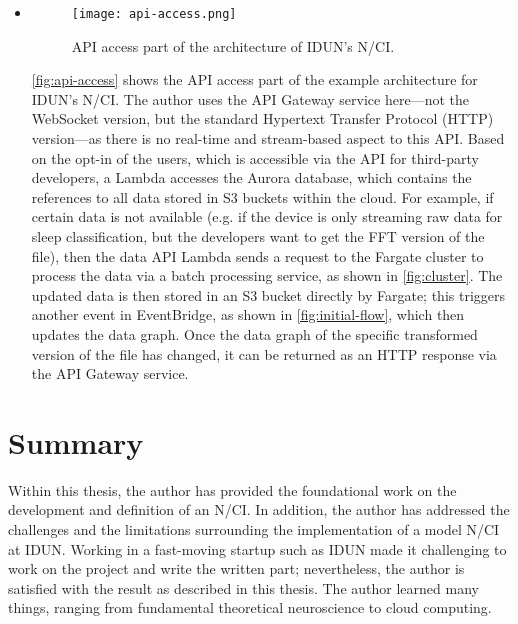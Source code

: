 \begin{itemize}
\newpage

  \item \begin{figure}[!ht]
          \centering
          \hspace*{0.4in}
          \texttt{[image: api-access.png]}
          \caption{API access part of the architecture of IDUN’s N/CI.}
          \label{fig:api-access}
        \end{figure}

        \autoref{fig:api-access} shows the API access part of the example architecture for IDUN’s N/CI. The author uses the API Gateway service here—not the WebSocket version, but the standard Hypertext Transfer Protocol (HTTP) version—as there is no real-time and stream-based aspect to this API. Based on the opt-in of the users, which is accessible via the API for third-party developers, a Lambda accesses the Aurora database, which contains the references to all data stored in S3 buckets within the cloud. For example, if certain data is not available (e.g. if the device is only streaming raw data for sleep classification, but the developers want to get the FFT version of the file), then the data API Lambda sends a request to the Fargate cluster to process the data via a batch processing service, as shown in \autoref{fig:cluster}. The updated data is then stored in an S3 bucket directly by Fargate; this triggers another event in EventBridge, as shown in \autoref{fig:initial-flow}, which then updates the data graph. Once the data graph of the specific transformed version of the file has changed, it can be returned as an HTTP response via the API Gateway service.

\end{itemize}

\section{Summary}
\label{chapter5-summary}

Within this thesis, the author has provided the foundational work on the development and definition of an N/CI. In addition, the author has addressed the challenges and the limitations surrounding the implementation of a model N/CI at IDUN. Working in a fast-moving startup such as IDUN made it challenging to work on the project and write the written part; nevertheless, the author is satisfied with the result as described in this thesis. The author learned many things, ranging from fundamental theoretical neuroscience to cloud computing.

